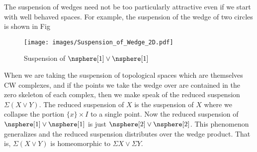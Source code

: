         The suspension of wedges need not be too particularly attractive
        even if we start with well behaved spaces. For example, the
        suspension of the wedge of two circles is shown in Fig
        \begin{figure}[H]
            \centering
            \captionsetup{type=figure}
            \texttt{[image: images/Suspension\_of\_Wedge\_2D.pdf]}
            \caption{Suspension of $\nsphere[1]\lor\nsphere[1]$}
            \label{fig:Suspesnion_of_Wedge}
        \end{figure}
        When we are taking the suspension of topological spaces which
        are themselves CW complexes, and if the points we take the wedge
        over are contained in the zero skeleton of each complex, then we
        make speak of the reduced suspension $\Sigma(X\lor{Y})$. The
        reduced suspension of $X$ is the suspension of $X$ where we
        collapse the portion $\{x\}\times{I}$ to a single point. Now the
        reduced suspension of $\nsphere[1]\lor\nsphere[1]$ is just
        $\nsphere[2]\lor\nsphere[2]$. This phenomenon generalizes and
        the reduced suspension distributes over the wedge product. That
        is, $\Sigma(X\lor{Y})$ is homeomorphic to
        $\Sigma{X}\lor\Sigma{Y}$.

